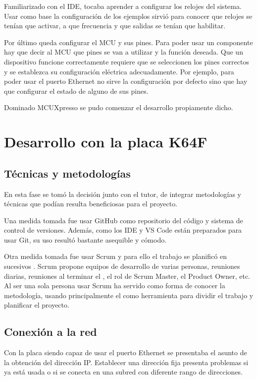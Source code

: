 Familiarizado con el IDE, tocaba aprender a configurar los relojes del sistema.
Usar como base la configuración de los ejemplos sirvió para conocer que relojes
se tenían que activar, a que frecuencia y que salidas se tenían que habilitar.

Por último queda configurar el MCU y sus pines. Para poder usar un componente
hay que decir al MCU que pines se van a utilizar y la función deseada. Que un
dispositivo funcione correctamente requiere que se seleccionen los pines 
correctos y se establezca su configuración eléctrica adecuadamente. Por ejemplo,
para poder usar el puerto Ethernet no sirve la configuración por defecto sino
que hay que configurar el estado  de alguno de sus pines.

Dominado MCUXpresso se pudo comenzar el desarrollo propiamente dicho.

\section{Desarrollo con la placa K64F}{\label{sec:desarrollo-k64f}}

\subsection{Técnicas y metodologías}{\label{sec:desarrollo-tym}}
En esta fase se tomó la decisión junto con el tutor, de integrar metodologías y 
técnicas que podían resulta beneficiosas para el proyecto.

Una medida tomada fue usar GitHub como repositorio del código y sistema de 
control de versiones. Además, como los IDE y VS Code están preparados para
usar Git, su uso resultó bastante asequible y cómodo.

Otra medida tomada fue usar Scrum y para ello el trabajo se planificó en
sucesivos . Scrum propone equipos de desarrollo
de varias personas, reuniones diarias, reuniones al terminar el
, el rol de Scrum Master, el Product Owner, etc.
Al ser una sola persona usar Scrum ha servido como forma de conocer la
metodología, usando principalmente el  como herramienta
para dividir el trabajo y planificar el proyecto.

\subsection{Conexión a la red}{\label{sec:desarrollo-red}}
Con la placa siendo capaz de usar el puerto Ethernet se presentaba el asunto
de la obtención del dirección IP. Establecer una dirección fija presenta
problemas si ya está usada o si se conecta en una subred con diferente rango
de direcciones.

